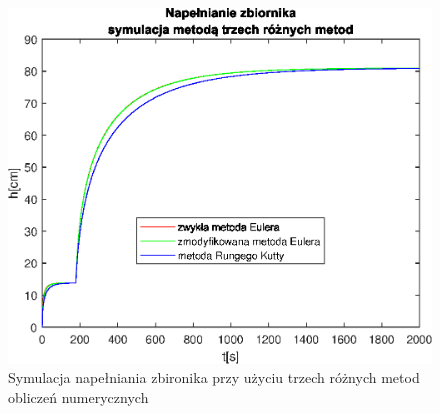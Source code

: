 \begin{figure}[tb]
   \centering
   \includegraphics{img/object-simulation/method-comparison-flow.eps}
   \caption{Symulacja napełniania zbironika przy użyciu trzech różnych metod obliczeń numerycznych}
   \label{fig:method-comparison-flow}
\end{figure}
            
